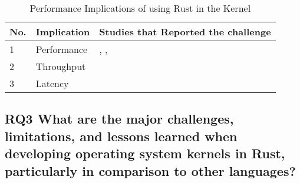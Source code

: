 \documentclass[sigconf,review,anonymous]{acmart}
\begin{document}
\begin{table}
    \begin{tabular}{||l|l|l||}
    \hline
    No. & Implication & Studies that Reported the challenge\\
    \hline\hline
    1 & Performance & \cite{Gonzalez2023-ek}, \cite{Li2024-be}, \cite{Ma2023-ef}\\
    2 & Throughput & \cite{Gonzalez2023-ek}\\
    3 & Latency & \cite{Culic2022-bk} \\
    \hline
  \end{tabular}
  \caption{Performance Implications of using Rust in the Kernel}
    \label{tab:RQ2}
\end{table}

\subsection{RQ3 What are the major challenges, limitations, and lessons learned when
      developing operating system kernels in Rust, particularly in comparison to other languages?}
\end{document}
